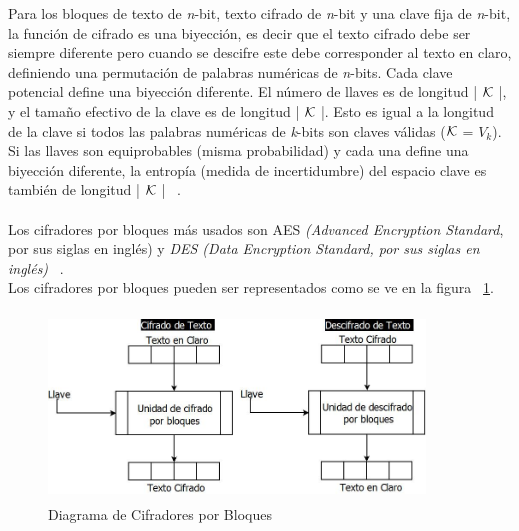 Para los bloques de texto de \textit{n}-bit, texto cifrado de \textit{n}-bit y una clave fija de \textit{n}-bit, la función de cifrado es
una biyección, es decir que el texto cifrado debe ser siempre diferente pero cuando se descifre este debe corresponder al texto en claro, definiendo una permutación de palabras numéricas de \textit{n}-bits. Cada clave potencial define una biyección diferente. El número de llaves es de longitud | $\cal{K}$ |, y el tamaño efectivo de la clave es de longitud | $\cal{K}$ |. Esto es igual a la longitud de la clave si todos las palabras numéricas de \textit{k}-bits son claves válidas ($\cal{K}$ = $V_{\textit{k}}$). Si las llaves son equiprobables (misma probabilidad) y cada una define una biyección diferente, la entropía (medida de incertidumbre) del espacio clave es también de longitud | $\cal K$ | ~\cite{menezes}. \\ \\


Los cifradores por bloques más usados son AES \textit{(Advanced Encryption Standard}, por sus 
siglas en ingl\'es) y \textit{DES (Data Encryption Standard, por sus siglas en inglés)} ~\cite{bloques}.\\ 

Los cifradores por bloques pueden ser representados como se ve en la figura ~\ref{fig:2-5-1}.

\begin{figure}[H]
\centering
\includegraphics[width=10cm, height=5cm]{./images/CifradoBloques.jpeg}
\caption{Diagrama de Cifradores por Bloques}
\label{fig:2-5-1}
\end{figure}



